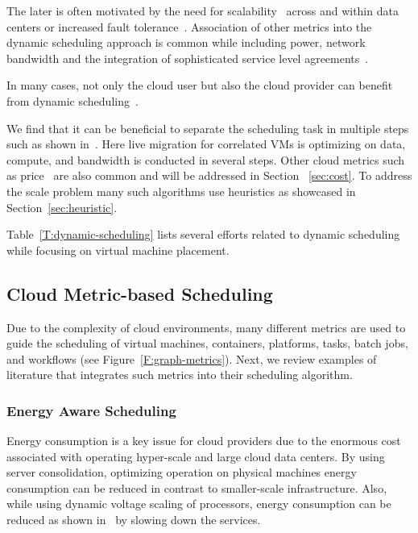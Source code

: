 \documentclass[final,5p,times,twocolumn]{elsarticle}
\begin{document}
The later is often motivated by the need for scalability~\cite{keller2014hierarchical} across and within data centers or increased fault tolerance~\cite{tighe2013distributed}. Association of other metrics into the dynamic scheduling approach is common while including power, network bandwidth and the integration of sophisticated service level agreements~\cite{tighe2013distributed}.

In many cases, not only the cloud user but also the cloud provider can benefit from dynamic scheduling~\cite{tighe2014integrating}.

We find that it can be beneficial to separate the scheduling task in multiple steps such as shown in~\cite{sun2015live}. Here live migration for correlated VMs is optimizing on data, compute, and bandwidth is conducted in several steps. Other cloud metrics such as price~\cite{tordsson2012cloud} are also common and will be addressed in Section ~\ref{sec:cost}. To address the scale problem many such algorithms use heuristics as showcased in Section~\ref{sec:heuristic}.

Table~\ref{T:dynamic-scheduling} lists several efforts related to dynamic scheduling while focusing on virtual machine placement.


%



\subsection{Cloud Metric-based Scheduling}\label{sec:vm-scheduling}

Due to the complexity of cloud environments, many different metrics are used to guide the scheduling of virtual machines, containers, platforms, tasks, batch jobs, and workflows (see Figure~\ref{F:graph-metrics}). Next, we review examples of literature that integrates such metrics into their scheduling algorithm.


% 


\subsubsection{Energy Aware Scheduling}\label{sec:energy}

Energy consumption is a key issue for cloud providers due to the enormous cost associated with operating hyper-scale and large cloud data centers. By using server consolidation, optimizing operation on physical machines energy consumption can be reduced in contrast to smaller-scale infrastructure. Also, while using dynamic voltage scaling of processors, energy consumption can be reduced as shown in~\cite{las09dvfs,las10dvfs,calheiros2014energy} by slowing down the services.
\end{document}
